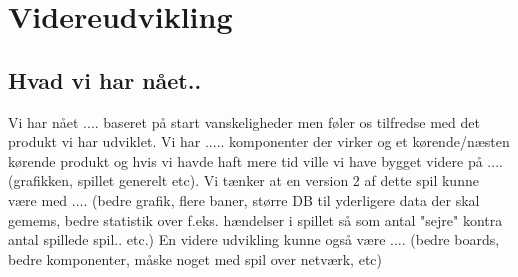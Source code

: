 \chapter{Videreudvikling}\label{cha:videreudv}
\section{Hvad vi har nået..}
Vi har nået .... baseret på start vanskeligheder men føler os tilfredse med det produkt vi har udviklet. Vi har ..... komponenter der virker og et kørende/næsten kørende produkt og hvis vi havde haft mere tid ville vi have bygget videre på .... (grafikken, spillet generelt etc). Vi tænker at en version 2 af dette spil kunne være med .... (bedre grafik, flere baner, større DB til yderligere data der skal gemems, bedre statistik over f.eks. hændelser i spillet så som antal "sejre" kontra antal spillede spil.. etc.)
En videre udvikling kunne også være .... (bedre boards, bedre komponenter, måske noget med spil over netværk, etc)